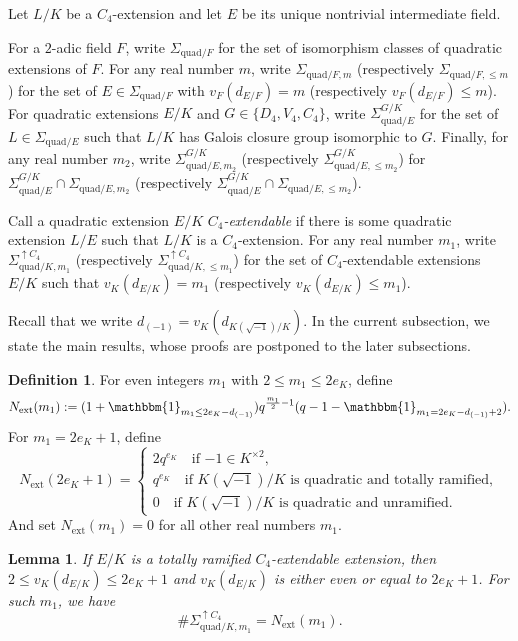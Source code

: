 \documentclass[11pt]{amsart}
\theoremstyle{theorem}
\newtheorem{lemma}[theorem]{Lemma}
\theoremstyle{example}
\theoremstyle{definition}
\newtheorem{definition}[theorem]{Definition}
\numberwithin{theorem}{section}
\numberwithin{theorem}{section}
\newcommand{\ext}{\mathrm{ext}}
\newcommand{\quadr}{\mathrm{quad}}
\newcommand{\extendable}{\uparrow C_4}
\begin{document}
Let $L/K$ be a $C_4$-extension and let $E$ be its unique nontrivial intermediate field. 

For a $2$-adic field $F$, write $\Sigma_{\quadr/F}$ for the set of isomorphism classes of quadratic extensions of $F$. For any real number $m$, write $\Sigma_{\quadr/F,m}$ (respectively $\Sigma_{\quadr/F,\leq m}$) for the set of $E \in \Sigma_{\quadr/F}$ with $v_F(d_{E/F}) = m$ (respectively $v_F(d_{E/F}) \leq m$). For quadratic extensions $E/K$ and $G \in \{D_4, V_4,C_4\}$, write $\Sigma_{\quadr/E}^{G/K}$ for the set of $L \in \Sigma_{\quadr/E}$ such that $L/K$ has Galois closure group isomorphic to $G$. Finally, for any real number $m_2$, write $\Sigma_{\quadr/E,m_2}^{G/K}$  (respectively $\Sigma_{\quadr/E,\leq m_2}^{G/K}$) for $\Sigma_{\quadr/E}^{G/K} \cap \Sigma_{\quadr/E,m_2}$ (respectively $\Sigma_{\quadr/E}^{G/K} \cap \Sigma_{\quadr/E,\leq m_2}$).

Call a quadratic extension $E/K$ \emph{$C_4$-extendable} if there is some quadratic extension $L/E$ such that $L/K$ is a $C_4$-extension. For any real number $m_1$, write $\Sigma^{\extendable}_{\quadr/K,m_1}$ (respectively $\Sigma^{\extendable}_{\quadr/K,\leq m_1}$) for the set of $C_4$-extendable extensions $E/K$ such that $v_K(d_{E/K}) = m_1$ (respectively $v_K(d_{E/K}) \leq m_1$). 

Recall that we write $d_{(-1)} = v_K(d_{K(\sqrt{-1})/K})$. In the current subsection, we state the main results, whose proofs are postponed to the later subsections. 
\begin{definition}
    \label{defi-N-ext}
    For even integers $m_1$ with $2 \leq m_1 \leq 2e_K$, define 
$$
N_{\ext}(m_1) := (1 + \mathbbm{1}_{m_1\leq 2e_K - d_{(-1)}})q^{\frac{m_1}{2} - 1}(q - 1 - \mathbbm{1}_{m_1 = 2e_K - d_{(-1)} + 2}).
$$
For $m_1 = 2e_K + 1$, define
    $$
    N_{\ext}(2e_K + 1) = \begin{cases}
        2q^{e_K}\quad\text{if $-1 \in K^{\times 2}$},
        \\
        q^{e_K} \quad\text{if $K(\sqrt{-1})/K$ is quadratic and totally ramified},
        \\
        0\quad\text{if $K(\sqrt{-1})/K$ is quadratic and unramified}.
    \end{cases}
    $$
And set $N_{\ext}(m_1) = 0$ for all other real numbers $m_1$. 
\end{definition}
\begin{lemma}
    \label{lem-N-ext}
    If $E/K$ is a totally ramified $C_4$-extendable extension, then $2 \leq v_K(d_{E/K}) \leq 2e_K + 1$ and $v_K(d_{E/K})$ is either even or equal to $2e_K + 1$. For such $m_1$, we have 
    $$
    \#\Sigma^{\extendable}_{\quadr/K,m_1} = N_{\ext}(m_1). 
    $$
\end{lemma}
\end{document}
